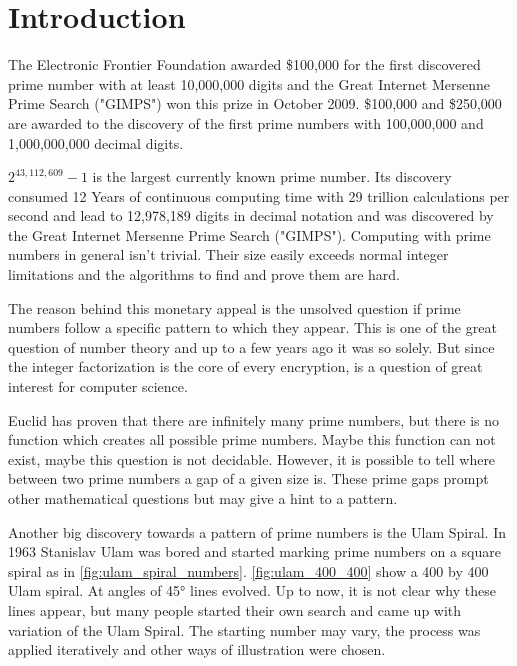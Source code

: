 \section{Introduction}
\label{sec:intro}

The Electronic Frontier Foundation awarded \$100,000 for the first discovered prime number with at least 10,000,000 digits and the Great Internet Mersenne Prime Search ("GIMPS") won this prize in October 2009. \$100,000 and \$250,000 are awarded to the discovery of the first prime numbers with 100,000,000 and 1,000,000,000 decimal digits.

$2^{43,112,609}-1$ is the largest currently known prime number. Its discovery consumed 12 Years of continuous computing time with 29 trillion calculations per second and lead to 12,978,189 digits in decimal notation and was discovered by the Great Internet Mersenne Prime Search ("GIMPS").
Computing with prime numbers in general isn't trivial. Their size easily exceeds normal integer limitations and the algorithms to find and prove them are hard.

The reason behind this monetary appeal is the unsolved question if prime numbers follow a specific pattern to which they appear. This is one of the great question of number theory and up to a few years ago it was so solely. But since the integer factorization is the core of every encryption, is a question of great interest for computer science.  

Euclid has proven that there are infinitely many prime numbers, but there is no function which creates all possible prime numbers. Maybe this function can not exist, maybe this question is not decidable.\cite{zahlentheorie} However, it is possible to tell where between two prime numbers a gap of a given size is. These prime gaps prompt other mathematical questions but may give a hint to a pattern.

Another big discovery towards a pattern of prime numbers is the Ulam Spiral. In 1963 Stanislav Ulam was bored and started marking prime numbers on a square spiral as in \ref{fig:ulam_spiral_numbers}. \ref{fig:ulam_400_400} show a 400 by 400 Ulam spiral. At angles of 45° lines evolved. Up to now, it is not clear why these lines appear, but many people started their own search and came up with variation of the Ulam Spiral. The starting number may vary, the process was applied iteratively\cite{web} and other ways of illustration were chosen\cite{web}.

\begin{figure}[H]
\begin{minipage}[t]{0.475\textwidth}
\centering
\end{minipage}
\hfill
\begin{minipage}[t]{0.475\textwidth}
\centering
\end{minipage}
\end{figure}

